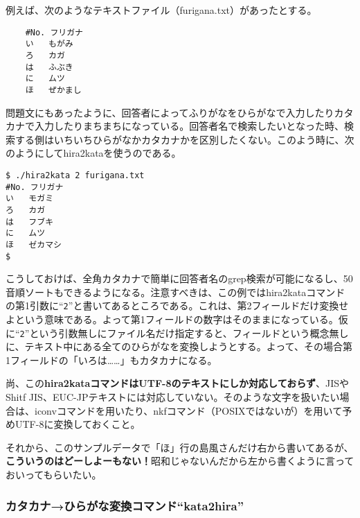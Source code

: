 例えば、次のようなテキストファイル（furigana.txt）があったとする。\\
\begin{frameboxit}{160.0mm}
\begin{verbatim}
	#No. フリガナ
	い   もがみ
	ろ   カガ
	は   ふぶき
	に   ムツ
	ほ   ぜかまし
\end{verbatim}
\end{frameboxit}

問題文にもあったように、回答者によってふりがなをひらがなで入力したりカタカナで入力したりまちまちになっている。回答者名で検索したいとなった時、検索する側はいちいちひらがなかカタカナかを区別したくない。このよう時に、次のようにしてhira2kataを使うのである。
\begin{screen}
	\verb!$ ./hira2kata 2 furigana.txt! \return \\
	\verb|#No. フリガナ| \\
	\verb|い   モガミ| \\
	\verb|ろ   カガ| \\
	\verb|は   フブキ| \\
	\verb|に   ムツ| \\
	\verb|ほ   ゼカマシ| \\
	\verb|$ |
\end{screen}

こうしておけば、全角カタカナで簡単に回答者名のgrep検索が可能になるし、50音順ソートもできるようになる。注意すべきは、この例ではhira2kataコマンドの第1引数に``\verb|2|''と書いてあるところである。これは、第2フィールドだけ変換せよという意味である。よって第1フィールドの数字はそのままになっている。仮に``\verb|2|''という引数無しにファイル名だけ指定すると、フィールドという概念無しに、テキスト中にある全てのひらがなを変換しようとする。よって、その場合第1フィールドの「いろは……」もカタカナになる。

尚、この\textbf{hira2kataコマンドはUTF-8のテキストにしか対応しておらず}、JISやShitf JIS、EUC-JPテキストには対応していない。そのような文字を扱いたい場合は、iconvコマンドを用いたり、nkfコマンド（POSIXではないが）を用いて予めUTF-8に変換しておくこと。

それから、このサンプルデータで「ほ」行の島風さんだけ右から書いてあるが、\textbf{こういうのはどーしよーもない！}昭和じゃないんだから左から書くように言っておいってもらいたい。

\subsubsection*{カタカナ→ひらがな変換コマンド``kata2hira''}

